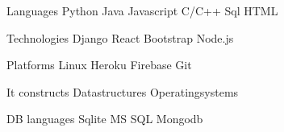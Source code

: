 

\begin{cvskills}

  \cvskill
    {Languages} %
    {Python\hspace{0.4cm} Java\hspace{0.4cm} Javascript\hspace{0.4cm} C/C++\hspace{0.4cm} Sql\hspace{0.4cm} HTML\hspace{0.4cm}} %

  \cvskill
    {Technologies} %
    {Django\hspace{0.4cm} React\hspace{0.4cm} Bootstrap\hspace{0.4cm} Node.js\hspace{0.4cm}} %

  \cvskill
    {Platforms} %
    {Linux\hspace{0.4cm} Heroku\hspace{0.4cm} Firebase\hspace{0.4cm} Git\hspace{0.4cm}}

  \cvskill
    {It constructs} %
    {Datastructures\hspace{0.4cm} Operatingsystems\hspace{0.4cm}}

  \cvskill
    {DB languages} %
    {Sqlite\hspace{0.4cm} MS SQL\hspace{0.4cm} Mongodb\hspace{0.4cm}} %
\end{cvskills}

